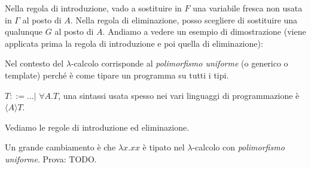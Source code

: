 \documentclass{article}
\begin{document}
\bigskip

\begin{minipage}{0.49\textwidth}
\end{minipage}
{
\hspace{2em}
\begin{minipage}{0.49\textwidth}
\end{minipage}}

\bigskip

Nella regola di introduzione, vado a sostituire in $F$ una variabile fresca non usata in $\Gamma$ al posto di $A$. Nella regola di eliminazione, posso scegliere di sostituire una qualunque $G$ al posto di $A$. Andiamo a vedere un esempio di dimostrazione (viene applicata prima la regola di introduzione e poi quella di eliminazione):

\bigskip


\bigskip

Nel contesto del $\lambda$-calcolo corrisponde al {\color{red}\textit{polimorfismo uniforme}} (o generico o template) perché è come tipare un programma su tutti i tipi.

\bigskip

$T::= ...|\,\,\forall A.T$, una sintassi usata spesso nei vari linguaggi di programmazione è $\langle A\rangle T$.

\bigskip

Vediamo le regole di introduzione ed eliminazione.

\bigskip

\begin{minipage}{0.49\textwidth}
\end{minipage}
{
\hspace{2em}
\begin{minipage}{0.49\textwidth}
\end{minipage}}

\bigskip

Un grande cambiamento è che $\lambda x.xx$ è tipato nel $\lambda$-calcolo con \textit{polimorfismo uniforme}. Prova: TODO.
\end{document}
